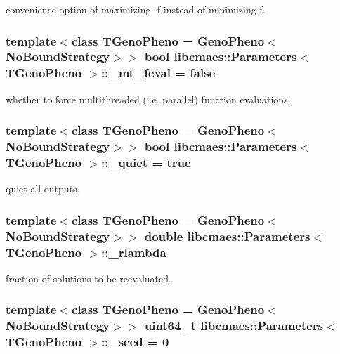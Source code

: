 convenience option of maximizing -\/f instead of minimizing f. \hypertarget{classlibcmaes_1_1Parameters_a78a3b97b4119776b661c1be4fc283069}{
\subsubsection[{\+\_\+mt\+\_\+feval}]{\setlength{\rightskip}{0pt plus 5cm}template$<$class T\+Geno\+Pheno = Geno\+Pheno$<$\+No\+Bound\+Strategy$>$$>$ bool {\bf libcmaes\+::\+Parameters}$<$ T\+Geno\+Pheno $>$\+::\+\_\+mt\+\_\+feval = false\hspace{0.3cm}{\ttfamily [protected]}}}\label{classlibcmaes_1_1Parameters_a78a3b97b4119776b661c1be4fc283069}
whether to force multithreaded (i.\+e. parallel) function evaluations. \hypertarget{classlibcmaes_1_1Parameters_a6f6dad55c02a23891e3280cad288295a}{
\subsubsection[{\+\_\+quiet}]{\setlength{\rightskip}{0pt plus 5cm}template$<$class T\+Geno\+Pheno = Geno\+Pheno$<$\+No\+Bound\+Strategy$>$$>$ bool {\bf libcmaes\+::\+Parameters}$<$ T\+Geno\+Pheno $>$\+::\+\_\+quiet = true\hspace{0.3cm}{\ttfamily [protected]}}}\label{classlibcmaes_1_1Parameters_a6f6dad55c02a23891e3280cad288295a}
quiet all outputs. \hypertarget{classlibcmaes_1_1Parameters_a35486ec0b31b3450a0cb10e54f16b7fd}{
\subsubsection[{\+\_\+rlambda}]{\setlength{\rightskip}{0pt plus 5cm}template$<$class T\+Geno\+Pheno = Geno\+Pheno$<$\+No\+Bound\+Strategy$>$$>$ double {\bf libcmaes\+::\+Parameters}$<$ T\+Geno\+Pheno $>$\+::\+\_\+rlambda\hspace{0.3cm}{\ttfamily [protected]}}}\label{classlibcmaes_1_1Parameters_a35486ec0b31b3450a0cb10e54f16b7fd}
fraction of solutions to be reevaluated. \hypertarget{classlibcmaes_1_1Parameters_ac6d616c3d5295fec8a0b230592fb767a}{
\subsubsection[{\+\_\+seed}]{\setlength{\rightskip}{0pt plus 5cm}template$<$class T\+Geno\+Pheno = Geno\+Pheno$<$\+No\+Bound\+Strategy$>$$>$ uint64\+\_\+t {\bf libcmaes\+::\+Parameters}$<$ T\+Geno\+Pheno $>$\+::\+\_\+seed = 0\hspace{0.3cm}{\ttfamily [protected]}}}\label{classlibcmaes_1_1Parameters_ac6d616c3d5295fec8a0b230592fb767a}

